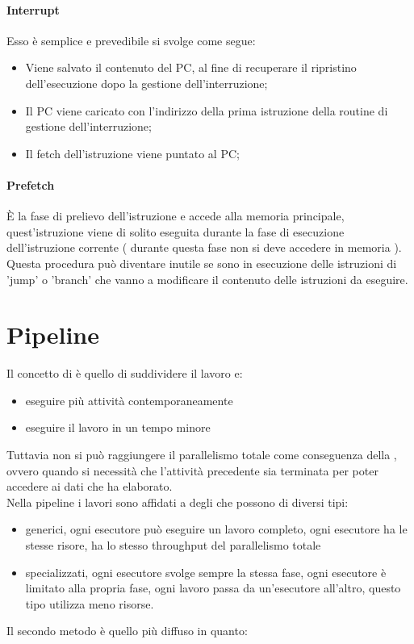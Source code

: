 \documentclass[arch.tex]{subfiles}
\begin{document}
\paragraph{Interrupt}%
\label{par:interrupt}
Esso è semplice e prevedibile si svolge come segue:

\begin{itemize}
	\item Viene salvato il contenuto del PC, al fine di recuperare il ripristino dell'esecuzione dopo
		la gestione dell'interruzione;
	\item Il PC viene caricato con l'indirizzo della prima istruzione della routine di gestione 
		dell'interruzione;
	\item Il fetch dell'istruzione viene puntato al PC;
\end{itemize}

\paragraph{Prefetch}%
\label{par:prefetch}

È la fase di prelievo dell'istruzione e accede alla memoria principale, quest'istruzione viene di solito
eseguita durante la fase di esecuzione dell'istruzione corrente ( durante questa fase non si deve accedere in memoria ).\\
Questa procedura può diventare inutile se sono in esecuzione delle istruzioni di 'jump' o 'branch' che vanno
a modificare il contenuto delle istruzioni da eseguire.


\section{Pipeline}%
\label{sec:pipeline}
Il concetto di  è quello di suddividere il lavoro e:

\begin{itemize}
	\item eseguire più attività contemporaneamente
	\item eseguire il lavoro in un tempo minore
\end{itemize}
Tuttavia non si può raggiungere il parallelismo totale come conseguenza della , ovvero quando si necessità che l'attività precedente sia
terminata per poter accedere ai dati che ha elaborato.\\
Nella pipeline i lavori sono affidati a degli  che possono
di diversi tipi:

\begin{itemize}
	\item generici, ogni esecutore può eseguire un lavoro completo,
		ogni esecutore ha le stesse risore, ha lo stesso throughput del
		parallelismo totale
	\item specializzati, ogni esecutore svolge sempre la stessa fase,
		ogni esecutore è limitato alla propria fase, ogni lavoro passa 
		da un'esecutore all'altro, questo tipo utilizza meno risorse.
\end{itemize}
Il secondo metodo è quello più diffuso in quanto:
\end{document}
